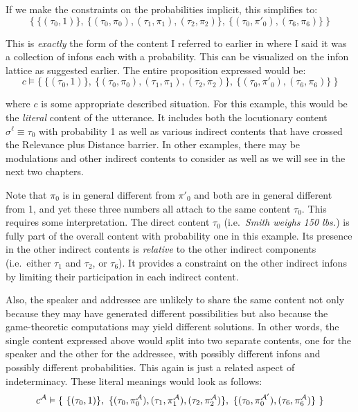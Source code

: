 \noindent If we make the constraints on the probabilities implicit, this simplifies to: \[\{\ \{(\tau_0, 1)\},\ \{(\tau_0, \pi_0), (\tau_1, \pi_1), (\tau_2, \pi_2)\},\ \{(\tau_0, \pi'_0), (\tau_6, \pi_6)\}\ \}\]

\noindent This is \emph{exactly} the form of the content I referred to earlier in  where I said it was a collection of infons each with a probability. This can be visualized on the infon lattice as suggested earlier. The entire proposition expressed would be: \[c \vDash \{\ \{(\tau_0, 1)\},\ \{(\tau_0, \pi_0), (\tau_1, \pi_1), (\tau_2, \pi_2)\},\ \{(\tau_0, \pi'_0), (\tau_6, \pi_6)\}\ \}\]

\noindent where $c$ is some appropriate described situation. For this example, this would be the \emph{literal} content of the utterance. It includes both the locutionary content $\sigma^\ell \equiv \tau_0$ with probability 1 as well as various indirect contents that have crossed the Relevance plus Distance barrier. In other examples, there may be modulations and other indirect contents to consider as well as we will see in the next two chapters.

Note that $\pi_0$ is in general different from $\pi'_0$ and both are in general different from 1, and yet these three numbers all attach to the same content $\tau_0$. This requires some interpretation. The direct content $\tau_0$ (i.e.\ \emph{Smith weighs 150 lbs.}) is fully part of the overall content with probability one in this example. Its presence in the other indirect contents is \emph{relative} to the other indirect components (i.e.\ either $\tau_1$ and $\tau_2$, or $\tau_6$). It provides a constraint on the other indirect infons by limiting their participation in each indirect content.



Also, the speaker and addressee are unlikely to share the same content not only because they may have generated different possibilities but also because the game-theoretic computations may yield different solutions. In other words, the single content expressed above would split into two separate contents, one for the speaker and the other for the addressee, with possibly different infons and possibly different probabilities. This again is just a related aspect of indeterminacy. These literal meanings would look as follows:
\[c^{\cal A} \vDash \{\ \{(\tau_0, 1)\},\ \{(\tau_0, \pi^{\cal A}_0), (\tau_1, \pi^{\cal A}_1), (\tau_2, \pi^{\cal A}_2)\},\ \{(\tau_0, \pi^{{\cal A}'}_0), (\tau_6, \pi^{\cal A}_6)\}\ \}\]

